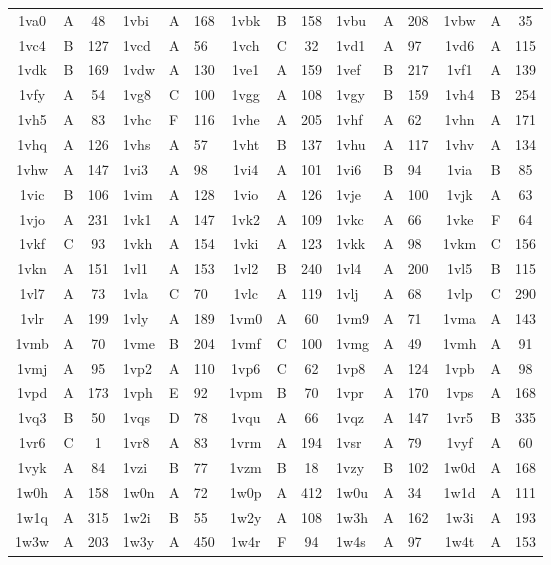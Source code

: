 \begin{longtable}{|c|c|c| a|a|a| c|c|c| a|a|a| c|c|c|}
1va0 & A & 48 & 1vbi & A & 168 & 1vbk & B & 158 & 1vbu & A & 208 & 1vbw & A & 35\\
1vc4 & B & 127 & 1vcd & A & 56 & 1vch & C & 32 & 1vd1 & A & 97 & 1vd6 & A & 115\\
1vdk & B & 169 & 1vdw & A & 130 & 1ve1 & A & 159 & 1vef & B & 217 & 1vf1 & A & 139\\
1vfy & A & 54 & 1vg8 & C & 100 & 1vgg & A & 108 & 1vgy & B & 159 & 1vh4 & B & 254\\
1vh5 & A & 83 & 1vhc & F & 116 & 1vhe & A & 205 & 1vhf & A & 62 & 1vhn & A & 171\\
1vhq & A & 126 & 1vhs & A & 57 & 1vht & B & 137 & 1vhu & A & 117 & 1vhv & A & 134\\
1vhw & A & 147 & 1vi3 & A & 98 & 1vi4 & A & 101 & 1vi6 & B & 94 & 1via & B & 85\\
1vic & B & 106 & 1vim & A & 128 & 1vio & A & 126 & 1vje & A & 100 & 1vjk & A & 63\\
1vjo & A & 231 & 1vk1 & A & 147 & 1vk2 & A & 109 & 1vkc & A & 66 & 1vke & F & 64\\
1vkf & C & 93 & 1vkh & A & 154 & 1vki & A & 123 & 1vkk & A & 98 & 1vkm & C & 156\\
1vkn & A & 151 & 1vl1 & A & 153 & 1vl2 & B & 240 & 1vl4 & A & 200 & 1vl5 & B & 115\\
1vl7 & A & 73 & 1vla & C & 70 & 1vlc & A & 119 & 1vlj & A & 68 & 1vlp & C & 290\\
1vlr & A & 199 & 1vly & A & 189 & 1vm0 & A & 60 & 1vm9 & A & 71 & 1vma & A & 143\\
1vmb & A & 70 & 1vme & B & 204 & 1vmf & C & 100 & 1vmg & A & 49 & 1vmh & A & 91\\
1vmj & A & 95 & 1vp2 & A & 110 & 1vp6 & C & 62 & 1vp8 & A & 124 & 1vpb & A & 98\\
1vpd & A & 173 & 1vph & E & 92 & 1vpm & B & 70 & 1vpr & A & 170 & 1vps & A & 168\\
1vq3 & B & 50 & 1vqs & D & 78 & 1vqu & A & 66 & 1vqz & A & 147 & 1vr5 & B & 335\\
1vr6 & C & 1 & 1vr8 & A & 83 & 1vrm & A & 194 & 1vsr & A & 79 & 1vyf & A & 60\\
1vyk & A & 84 & 1vzi & B & 77 & 1vzm & B & 18 & 1vzy & B & 102 & 1w0d & A & 168\\
1w0h & A & 158 & 1w0n & A & 72 & 1w0p & A & 412 & 1w0u & A & 34 & 1w1d & A & 111\\
1w1q & A & 315 & 1w2i & B & 55 & 1w2y & A & 108 & 1w3h & A & 162 & 1w3i & A & 193\\
1w3w & A & 203 & 1w3y & A & 450 & 1w4r & F & 94 & 1w4s & A & 97 & 1w4t & A & 153\\

\end{longtable}
